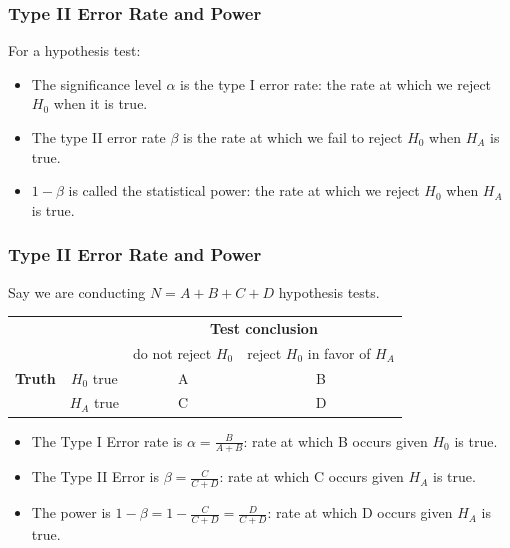 \documentclass[handout]{beamer}
\newcommand{\blue}[1]{\textcolor{blue2}{#1}}
\begin{document}
\begin{frame}
\frametitle{Type II Error Rate and Power}
%
%
For a hypothesis test:

\begin{itemize}
\item The significance level $\alpha$ is the \blue{type I error rate}:  the rate at which we reject $H_0$ when it is true.
\pause\item The \blue{type II error rate $\beta$} is the rate at which we fail to reject $H_0$ when $H_A$ is true.
\pause\item $1-\beta$ is called the \blue{statistical power}: the rate at which we reject $H_0$ when $H_A$ is true.  
\end{itemize}

\end{frame}



\begin{frame}
\frametitle{Type II Error Rate and Power}
%
%
Say we are conducting $N=A+B+C+D$ hypothesis tests.
\pause\begin{center}
  \begin{tabular}{cc|cc}
     \multicolumn{2}{c}{}  & \multicolumn{2}{c}{\textbf{Test conclusion}} \\ 
     &  & do not reject $H_0$ & reject $H_0$ in favor of $H_A$ \\ 
\hline
    \textbf{Truth} & $H_0$ true & A & B \\ 
     & $H_A$ true & C & D \\ 
    \hline
  \end{tabular}
\end{center}

\vspace{0.25cm}

\begin{itemize}
\pause \item The \blue{Type I Error rate} is $\alpha = \frac{B}{A+B}$: rate at which B occurs \blue{given $H_0$ is true}.
\pause \item The \blue{Type II Error} is $\beta = \frac{C}{C+D}$: rate at which 
C occurs \blue{given $H_A$ is true}.
\pause \item The \blue{power} is $1-\beta = 1-\frac{C}{C+D} = \frac{D}{C+D}$: rate at which D occurs \blue{given $H_A$ is true}.
\end{itemize}

\end{frame}
\end{document}
